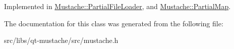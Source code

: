 Implemented in \hyperlink{classMustache_1_1PartialFileLoader_a36ba8b817708a8755293db46bceb0dbb}{Mustache\+::\+Partial\+File\+Loader}, and \hyperlink{classMustache_1_1PartialMap_a676a6f9a77cdd53e91b18216733b2781}{Mustache\+::\+Partial\+Map}.



The documentation for this class was generated from the following file\+:\begin{DoxyCompactItemize}
\item 
src/libs/qt-\/mustache/src/mustache.\+h\end{DoxyCompactItemize}
